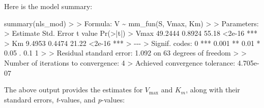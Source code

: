 \documentclass[
  letterpaper,
]{book}
\newenvironment{Shaded}{\begin{snugshade}}{\end{snugshade}}
\newcommand{\DecValTok}[1]{\textcolor[rgb]{0.68,0.00,0.00}{#1}}
\newcommand{\ErrorTok}[1]{\textcolor[rgb]{0.68,0.00,0.00}{#1}}
\newcommand{\FloatTok}[1]{\textcolor[rgb]{0.68,0.00,0.00}{#1}}
\newcommand{\FunctionTok}[1]{\textcolor[rgb]{0.28,0.35,0.67}{#1}}
\newcommand{\NormalTok}[1]{\textcolor[rgb]{0.00,0.23,0.31}{#1}}
\newcommand{\SpecialCharTok}[1]{\textcolor[rgb]{0.37,0.37,0.37}{#1}}
\newcommand{\StringTok}[1]{\textcolor[rgb]{0.13,0.47,0.30}{#1}}
\begin{document}
Here is the model summary:

\begin{Shaded}
\begin{Highlighting}[]
\FunctionTok{summary}\NormalTok{(nls\_mod)}
\SpecialCharTok{\textgreater{}} 
\ErrorTok{\textgreater{}}\NormalTok{ Formula}\SpecialCharTok{:}\NormalTok{ V }\SpecialCharTok{\textasciitilde{}} \FunctionTok{mm\_fun}\NormalTok{(S, Vmax, Km)}
\SpecialCharTok{\textgreater{}} 
\ErrorTok{\textgreater{}}\NormalTok{ Parameters}\SpecialCharTok{:}
\ErrorTok{\textgreater{}}\NormalTok{      Estimate Std. Error t value }\FunctionTok{Pr}\NormalTok{(}\SpecialCharTok{\textgreater{}}\ErrorTok{|}\NormalTok{t}\SpecialCharTok{|}\NormalTok{)    }
\SpecialCharTok{\textgreater{}}\NormalTok{ Vmax  }\FloatTok{49.2444}     \FloatTok{0.8924}   \FloatTok{55.18}   \SpecialCharTok{\textless{}}\FloatTok{2e{-}16} \SpecialCharTok{**}\ErrorTok{*}
\ErrorTok{\textgreater{}}\NormalTok{ Km     }\FloatTok{9.4953}     \FloatTok{0.4474}   \FloatTok{21.22}   \SpecialCharTok{\textless{}}\FloatTok{2e{-}16} \SpecialCharTok{**}\ErrorTok{*}
\ErrorTok{\textgreater{}} \SpecialCharTok{{-}{-}{-}}
\ErrorTok{\textgreater{}}\NormalTok{ Signif. codes}\SpecialCharTok{:}  \DecValTok{0} \StringTok{\textquotesingle{}***\textquotesingle{}} \FloatTok{0.001} \StringTok{\textquotesingle{}**\textquotesingle{}} \FloatTok{0.01} \StringTok{\textquotesingle{}*\textquotesingle{}} \FloatTok{0.05} \StringTok{\textquotesingle{}.\textquotesingle{}} \FloatTok{0.1} \StringTok{\textquotesingle{} \textquotesingle{}} \DecValTok{1}
\SpecialCharTok{\textgreater{}} 
\ErrorTok{\textgreater{}}\NormalTok{ Residual standard error}\SpecialCharTok{:} \FloatTok{1.092}\NormalTok{ on }\DecValTok{63}\NormalTok{ degrees of freedom}
\SpecialCharTok{\textgreater{}} 
\ErrorTok{\textgreater{}}\NormalTok{ Number of iterations to convergence}\SpecialCharTok{:} \DecValTok{4} 
\SpecialCharTok{\textgreater{}}\NormalTok{ Achieved convergence tolerance}\SpecialCharTok{:} \FloatTok{4.705e{-}07}
\end{Highlighting}
\end{Shaded}

The above output provides the estimates for \(V_{\max}\) and \(K_m\),
along with their standard errors, \emph{t}-values, and \emph{p}-values:
\end{document}
